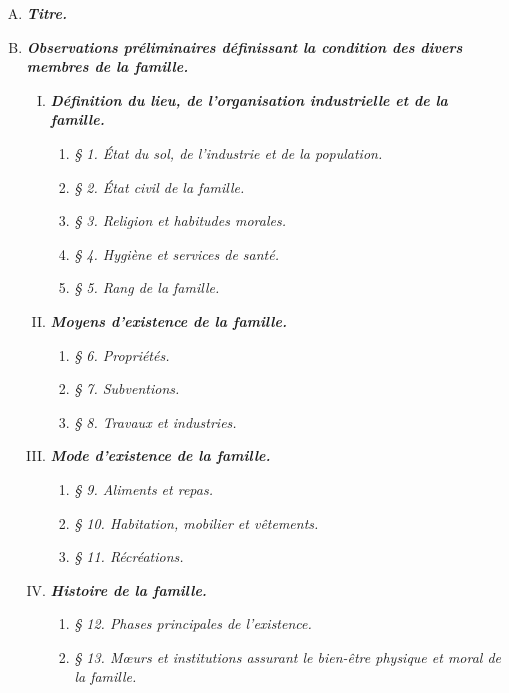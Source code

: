 \begin{enumerate}[A.]
    \item \textbf{\textit{Titre.}}
    \item \textbf{\textit{Observations préliminaires définissant la condition des divers membres de la famille.}}
    \begin{enumerate}[I.]
        \item \textbf{\textit{Définition du lieu, de l'organisation industrielle et de la famille.}}
        \begin{enumerate}[]
            \item \textit{§ 1. État du sol, de l'industrie et de la population.}
            \item \textit{§ 2. État civil de la famille.}
            \item \textit{§ 3. Religion et habitudes morales.}
            \item \textit{§ 4. Hygiène et services de santé.}
            \item \textit{§ 5. Rang de la famille.}
        \end{enumerate}
        \item \textbf{\textit{Moyens d'existence de la famille.}}
        \begin{enumerate}[]
            \item \textit{§ 6. Propriétés.}
            \item \textit{§ 7. Subventions.}
            \item \textit{§ 8. Travaux et industries.}
        \end{enumerate}
        \item \textbf{\textit{Mode d'existence de la famille.}}
        \begin{enumerate}[]
            \item \textit{§ 9. Aliments et repas.}
            \item \textit{§ 10. Habitation, mobilier et vêtements.}
            \item \textit{§ 11. Récréations.}
        \end{enumerate}
        \item \textbf{\textit{Histoire de la famille.}}
        \begin{enumerate}[]
            \item \textit{§ 12. Phases principales de l'existence.}
            \item \textit{§ 13. M\oe{}urs et institutions assurant le bien-être physique et moral de la famille.}
        \end{enumerate}

\end{enumerate}
\end{enumerate}
